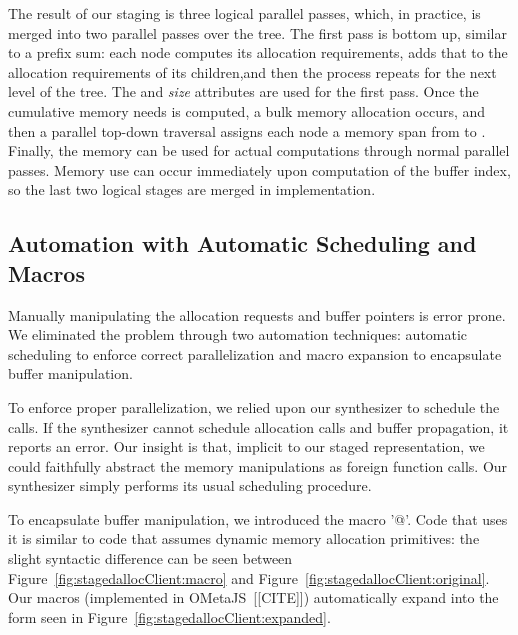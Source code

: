 The result of our staging is three logical parallel passes, which, in practice, is merged into two parallel passes over the tree. The first pass is bottom up, similar to a prefix sum: each node computes its allocation requirements, adds that to the allocation requirements of its children,and then the process repeats for the next level of the tree. The  and \emph{size} attributes are used for the first pass. Once the cumulative memory needs is computed, a bulk memory allocation occurs, and then a parallel top-down traversal assigns each node a memory span from  to . Finally, the memory can be used for actual computations through normal parallel passes. Memory use can occur immediately upon computation of the buffer index, so the last two logical stages are merged in implementation.

\subsection{Automation with Automatic Scheduling and Macros}
Manually manipulating the allocation requests and buffer pointers is error prone. We eliminated the problem through two automation techniques: automatic scheduling to enforce correct parallelization and macro expansion to encapsulate buffer manipulation.

To enforce proper parallelization, we relied upon our synthesizer to schedule the calls. If the synthesizer cannot schedule allocation calls and buffer propagation, it reports an error. Our insight is that, implicit to our staged representation, we could faithfully abstract the memory manipulations as foreign function calls. Our synthesizer simply performs its usual scheduling procedure.

To encapsulate buffer manipulation, we introduced the macro '@'.  Code that uses it is similar to code that assumes dynamic memory allocation primitives: the slight syntactic difference can be seen between Figure~\ref{fig:stagedallocClient:macro}  and Figure~\ref{fig:stagedallocClient:original}. Our macros (implemented in OMetaJS~[[CITE]]) automatically expand into the form seen in Figure~\ref{fig:stagedallocClient:expanded}.
